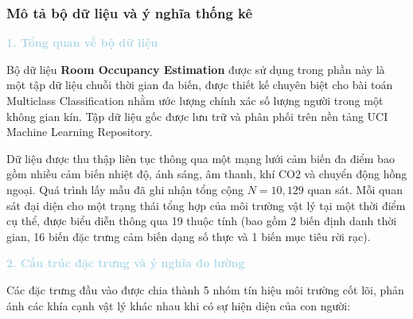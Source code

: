 \subsubsection{Mô tả bộ dữ liệu và ý nghĩa thống kê}

\vspace{0.5em}
\noindent\textcolor{lightblue}{\textbf{1. Tổng quan về bộ dữ liệu}}
\vspace{0.5em}

Bộ dữ liệu \textbf{Room Occupancy Estimation} được sử dụng trong phần này là một tập dữ liệu chuỗi thời gian đa biến, được thiết kế chuyên biệt cho bài toán Multiclass Classification nhằm ước lượng chính xác số lượng người trong một không gian kín. Tập dữ liệu gốc được lưu trữ và phân phối trên nền tảng UCI Machine Learning Repository.

Dữ liệu được thu thập liên tục thông qua một mạng lưới cảm biến đa điểm bao gồm nhiều cảm biến nhiệt độ, ánh sáng, âm thanh, khí CO2 và chuyển động hồng ngoại. Quá trình lấy mẫu đã ghi nhận tổng cộng $N = 10{,}129$ quan sát. Mỗi quan sát đại diện cho một trạng thái tổng hợp của môi trường vật lý tại một thời điểm cụ thể, được biểu diễn thông qua 19 thuộc tính (bao gồm 2 biến định danh thời gian, 16 biến đặc trưng cảm biến dạng số thực và 1 biến mục tiêu rời rạc).

\vspace{0.5em}
\noindent\textcolor{lightblue}{\textbf{2. Cấu trúc đặc trưng và ý nghĩa đo lường}}
\vspace{0.5em}

Các đặc trưng đầu vào được chia thành 5 nhóm tín hiệu môi trường cốt lõi, phản ánh các khía cạnh vật lý khác nhau khi có sự hiện diện của con người:

